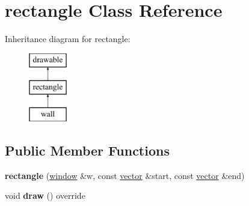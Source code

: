 \hypertarget{classrectangle}{}\section{rectangle Class Reference}
\label{classrectangle}
Inheritance diagram for rectangle\+:\begin{figure}[H]
\begin{center}
\leavevmode
\includegraphics[height=3.000000cm]{classrectangle}
\end{center}
\end{figure}
\subsection*{Public Member Functions}
\begin{DoxyCompactItemize}
\item 
\mbox{\label{classrectangle_a9e1157862932af46e234414c0bb56917}} 
{\bfseries rectangle} (\hyperlink{classwindow}{window} \&w, const \hyperlink{classvector}{vector} \&start, const \hyperlink{classvector}{vector} \&end)
\item 
\mbox{\label{classrectangle_a5337a6fe8058087413729c523aadd65d}} 
void {\bfseries draw} () override
\end{DoxyCompactItemize}
